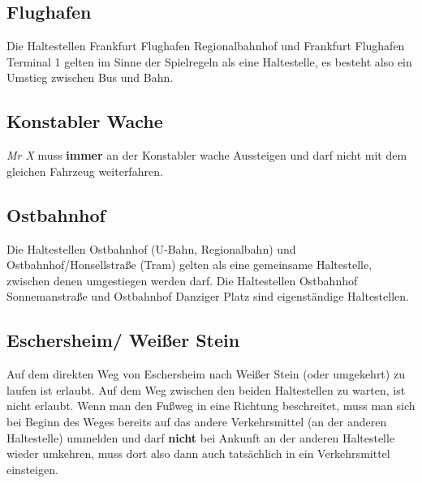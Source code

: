 \documentclass[12pt,a4paper]{article}
\begin{document}
\subsection{Flughafen}
Die Haltestellen Frankfurt Flughafen Regionalbahnhof und Frankfurt Flughafen Terminal 1 gelten im Sinne der Spielregeln als eine Haltestelle, es besteht also ein Umstieg zwischen Bus und Bahn.

\subsection{Konstabler Wache}
\textit{Mr X} muss \textbf{immer} an der Konstabler wache Aussteigen und darf nicht mit dem gleichen Fahrzeug weiterfahren.

\subsection{Ostbahnhof}
Die Haltestellen Ostbahnhof (U-Bahn, Regionalbahn) und Ostbahnhof/Honsellstraße (Tram) gelten als eine gemeinsame Haltestelle, zwischen denen umgestiegen werden darf.
Die Haltestellen Ostbahnhof Sonnemanstraße und Ostbahnhof Danziger Platz sind eigenständige Haltestellen.

\subsection{Eschersheim/ Weißer Stein}
Auf dem direkten Weg von Eschersheim nach Weißer Stein (oder umgekehrt) zu laufen ist erlaubt. 
Auf dem Weg zwischen den beiden Haltestellen zu warten, ist nicht erlaubt.
Wenn man den Fußweg in eine Richtung beschreitet, muss man sich bei Beginn des Weges bereits auf das andere Verkehrsmittel (an der anderen Haltestelle) ummelden und darf \textbf{nicht} bei Ankunft an der anderen Haltestelle wieder umkehren, muss dort also dann auch tatsächlich in ein Verkehrsmittel einsteigen.
\end{document}
